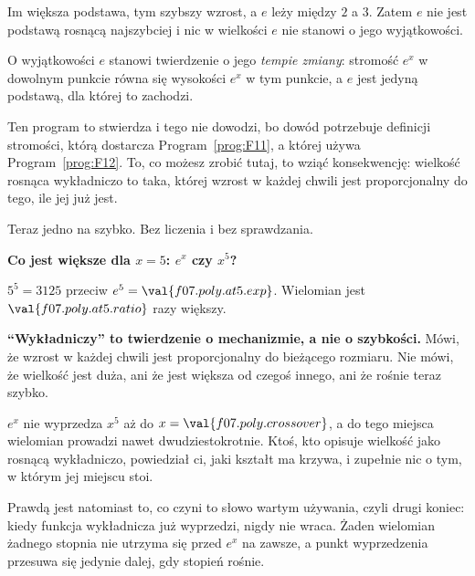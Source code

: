 \begin{fr}
Im większa podstawa, tym szybszy wzrost, a $e$ leży między $2$ a $3$. Zatem
$e$ nie jest podstawą rosnącą najszybciej i nic w wielkości $e$ nie stanowi o
jego wyjątkowości.

\begin{rigourbox}
O wyjątkowości $e$ stanowi twierdzenie o jego \emph{tempie zmiany}: stromość
$e^{x}$ w dowolnym punkcie równa się wysokości $e^{x}$ w tym punkcie, a $e$
jest jedyną podstawą, dla której to zachodzi.

Ten program to stwierdza i tego nie dowodzi, bo dowód potrzebuje definicji
stromości, którą dostarcza Program~\ref{prog:F11}, a której używa
Program~\ref{prog:F12}. To, co możesz zrobić tutaj, to wziąć konsekwencję:
wielkość rosnąca wykładniczo to taka, której wzrost w każdej chwili jest
proporcjonalny do tego, ile jej już jest.
\end{rigourbox}

Teraz jedno na szybko. Bez liczenia i bez sprawdzania.

\textbf{Co jest większe dla $x = 5$: $e^{x}$ czy $x^{5}$?}
\dotline
\nextframe
\end{fr}

\begin{fr}
$5^{5} = 3125$ przeciw $e^{5} = \val{f07.poly.at5.exp}$. Wielomian jest
$\val{f07.poly.at5.ratio}$ razy większy.

\begin{trapbox}
\textbf{\enquote{Wykładniczy} to twierdzenie o mechanizmie, a nie o
szybkości.} Mówi, że wzrost w każdej chwili jest proporcjonalny do bieżącego
rozmiaru. Nie mówi, że wielkość jest duża, ani że jest większa od czegoś
innego, ani że rośnie teraz szybko.

$e^{x}$ nie wyprzedza $x^{5}$ aż do $x = \val{f07.poly.crossover}$, a do tego
miejsca wielomian prowadzi nawet dwudziestokrotnie. Ktoś, kto opisuje wielkość
jako rosnącą wykładniczo, powiedział ci, jaki kształt ma krzywa, i zupełnie
nic o tym, w którym jej miejscu stoi.

Prawdą jest natomiast to, co czyni to słowo wartym używania, czyli drugi
koniec: kiedy funkcja wykładnicza już wyprzedzi, nigdy nie wraca. Żaden
wielomian żadnego stopnia nie utrzyma się przed $e^{x}$ na zawsze, a punkt
wyprzedzenia przesuwa się jedynie dalej, gdy stopień rośnie.
\end{trapbox}
\end{fr}

